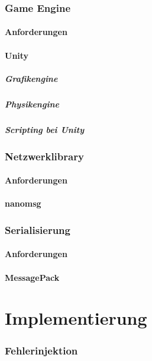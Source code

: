 \documentclass[ngerman]{scrartcl}
\begin{document}
\section{Game Engine}
\subsection{Anforderungen}
\subsection{Unity}
\subsubsection{Grafikengine}
\subsubsection{Physikengine}
\subsubsection{Scripting bei Unity}
\section{Netzwerklibrary}
\subsection{Anforderungen}
\subsection{nanomsg}
\section{Serialisierung}
\subsection{Anforderungen}
\subsection{MessagePack}


\part{Implementierung}
\section{Fehlerinjektion}
\end{document}
